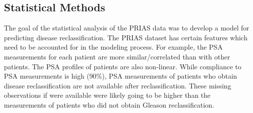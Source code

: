 \subsection{Statistical Methods}
The goal of the statistical analysis of the PRIAS data was to develop a model for predicting disease reclassification. The PRIAS dataset has certain features which need to be accounted for in the modeling process. For example, the PSA measurements for each patient are more similar/correlated than with other patients. The PSA profiles of patients are also non-linear. While compliance to PSA measurements is high (90\%), PSA measurements of patients who obtain disease reclassification are not available after reclassification. These missing observations if were available were likely going to be higher than the measurements of patients who did not obtain Gleason reclassification.

